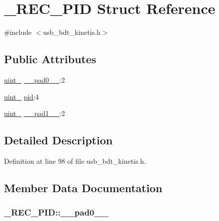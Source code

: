 \hypertarget{struct___r_e_c___p_i_d}{}\section{\+\_\+\+R\+E\+C\+\_\+\+P\+ID Struct Reference}
\label{struct___r_e_c___p_i_d}


{\ttfamily \#include $<$usb\+\_\+bdt\+\_\+kinetis.\+h$>$}

\subsection*{Public Attributes}
\begin{DoxyCompactItemize}
\item 
\hyperlink{types_8h_ad3209046c23f739a81581c10a4be7d92}{uint\+\_} \hyperlink{struct___r_e_c___p_i_d_aaa7dd573be94bf8edaf389f69112b055}{\+\_\+\+\_\+pad0\+\_\+\+\_\+}\+:2
\item 
\hyperlink{types_8h_ad3209046c23f739a81581c10a4be7d92}{uint\+\_} \hyperlink{struct___r_e_c___p_i_d_ad2360dd1337a1da11e55f7d579e62366}{pid}\+:4
\item 
\hyperlink{types_8h_ad3209046c23f739a81581c10a4be7d92}{uint\+\_} \hyperlink{struct___r_e_c___p_i_d_aa2a616bf23cf8b7189c342bbaa30b548}{\+\_\+\+\_\+pad1\+\_\+\+\_\+}\+:2
\end{DoxyCompactItemize}


\subsection{Detailed Description}


Definition at line 98 of file usb\+\_\+bdt\+\_\+kinetis.\+h.



\subsection{Member Data Documentation}
\subsubsection[{\texorpdfstring{\+\_\+\+\_\+pad0\+\_\+\+\_\+}{__pad0__}}]{ \+\_\+\+R\+E\+C\+\_\+\+P\+I\+D\+::\+\_\+\+\_\+pad0\+\_\+\+\_\+}\hypertarget{struct___r_e_c___p_i_d_aaa7dd573be94bf8edaf389f69112b055}{}\label{struct___r_e_c___p_i_d_aaa7dd573be94bf8edaf389f69112b055}


